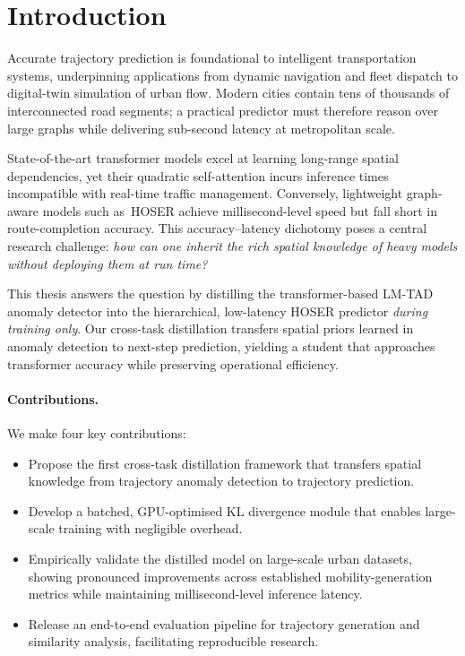 \section{Introduction}
\label{sec:introduction}

Accurate trajectory prediction is foundational to intelligent transportation systems, underpinning applications from dynamic navigation and fleet dispatch to digital-twin simulation of urban flow.  Modern cities contain tens of thousands of interconnected road segments; a practical predictor must therefore reason over large graphs
while delivering sub-second latency at metropolitan scale.

State-of-the-art transformer models excel at learning long-range spatial dependencies, yet their quadratic self-attention incurs inference times incompatible with real-time traffic management.  Conversely, lightweight graph-aware models such as\ HOSER achieve millisecond-level speed but fall short in route-completion accuracy.  This accuracy–latency dichotomy poses a central research challenge: \emph{how can one inherit the rich spatial knowledge of heavy models without deploying them at run time?}

This thesis answers the question by distilling the transformer-based LM-TAD anomaly detector into the hierarchical, low-latency HOSER predictor \emph{during training only}.  Our cross-task distillation transfers spatial priors learned in anomaly detection to next-step prediction, yielding a student that approaches transformer accuracy while preserving operational efficiency.

\paragraph{Contributions.}  We make four key contributions:
\begin{itemize}
  \item Propose the first cross-task distillation framework that transfers spatial knowledge from trajectory anomaly detection to trajectory prediction.
  \item Develop a batched, GPU-optimised KL divergence module that enables large-scale training with negligible overhead.
  \item Empirically validate the distilled model on large-scale urban datasets, showing pronounced improvements across established mobility-generation metrics while maintaining millisecond-level inference latency.
  \item Release an end-to-end evaluation pipeline for trajectory generation and similarity analysis, facilitating reproducible research.
\end{itemize}

